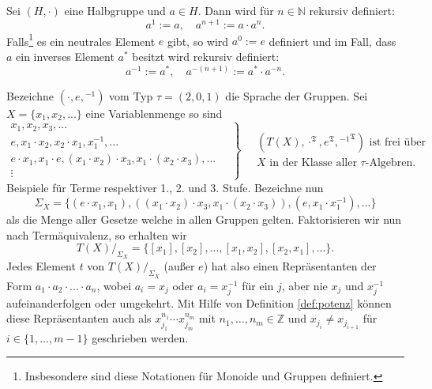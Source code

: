 
\begin{definition}\label{def:potenz}
    Sei $(H,\cdot)$ eine Halbgruppe und $a\in H$. Dann wird für $n\in\mathbb{N}$ rekursiv definiert:
    \[a^1:=a,\quad a^{n+1}:=a\cdot a^n.\]
    Falls\footnote{Insbesondere sind diese Notationen für Monoide und Gruppen definiert.} es ein neutrales Element $e$ gibt, so wird $a^0:=e$ definiert und im Fall, dass $a$ ein inverses Element $a^*$ besitzt
    wird rekursiv definiert:
    \[a^{-1}:=a^*,\quad a^{-(n+1)}:=a^*\cdot a^{-n}.\]
\end{definition}

\begin{example}\label{ex:gruppenterme}
    Bezeichne $(\cdot, e, {}^{-1})$ vom Typ $\tau = (2,0,1)$ die Sprache der Gruppen. Sei $X = \{ x_1, x_2, ... \}$ eine Variablenmenge so sind
    $$ \left. \begin{matrix} x_1, x_2, x_3, ... \\ e, x_1 \cdot x_2, x_2 \cdot x_1, x_1^{-1}, ... \\ e \cdot x_1, x_1 \cdot e, (x_1 \cdot x_2) \cdot x_3, x_1 \cdot (x_2 \cdot x_3), ... \\ \vdots \end{matrix} \quad \right\} \quad \begin{matrix} (T(X), \cdot^\mathfrak{T}, e^\mathfrak{T}, {{}^{-1}}^\mathfrak{T}) \textrm{ ist frei über} \\ X \textrm{ in der Klasse aller $\tau$-Algebren.} \end{matrix} $$
    Beispiele für Terme respektiver 1., 2. und 3. Stufe. Bezeichne nun
    $$ \Sigma_X = \{ (e \cdot x_1, x_1), ((x_1 \cdot x_2) \cdot x_3, x_1 \cdot (x_2 \cdot x_3)), (e, x_1 \cdot x_1^{-1}), ... \} $$
    als die Menge aller Gesetze welche in allen Gruppen gelten. Faktorisieren wir nun nach Term\-äquivalenz, so erhalten wir
    $$ T(X) /_{\Sigma_X} = \{ [x_1], [x_2], ..., [x_1, x_2], [x_2, x_1], ... \}. $$
    Jedes Element $t$ von $T(X) /_{\Sigma_X}$ (außer $e$) hat also einen Repräsentanten der Form $a_1 \cdot a_2 \cdot ... \cdot a_n$, wobei $a_i = x_j$ oder $a_i = x_j^{-1}$ für ein $j$, aber nie $x_j$ und $x_j^{-1}$ aufeinanderfolgen oder umgekehrt.
    Mit Hilfe von Definition \ref*{def:potenz} können diese Repräsentanten auch als $x_{j_1}^{n_1}\cdots x_{j_m}^{n_m}$ mit $n_1,\ldots,n_m\in\mathbb{Z}$ und $x_{j_i}\neq x_{j_{i+1}}$
    für $i\in\{1,\ldots,m-1\}$ geschrieben werden.
\end{example}

